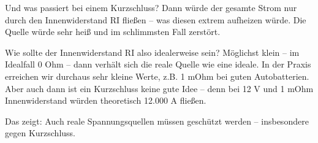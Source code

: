 \begin{frame}
{Und was passiert bei einem Kurzschluss?
Dann würde der gesamte Strom nur durch den Innenwiderstand RI fließen – was diesen extrem aufheizen würde.
Die Quelle würde sehr heiß und im schlimmsten Fall zerstört.

Wie sollte der Innenwiderstand RI also idealerweise sein?
Möglichst klein – im Idealfall 0 Ohm – dann verhält sich die reale Quelle wie eine ideale.
In der Praxis erreichen wir durchaus sehr kleine Werte, z.B. 1 mOhm bei guten Autobatterien.
Aber auch dann ist ein Kurzschluss keine gute Idee – denn bei 12 V und 1 mOhm Innenwiderstand würden theoretisch 12.000 A fließen.

Das zeigt: Auch reale Spannungsquellen müssen geschützt werden – insbesondere gegen Kurzschluss.
}

 \end{frame}

